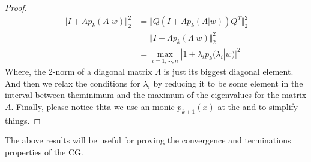 \documentclass[]{article}
\theoremstyle{definition}
\begin{document}
\begin{proof}
            \begin{align}
                \Vert I + Ap_k(A|w)\Vert_2^2
                &= \Vert Q(I + \Lambda p_k(\Lambda|w))Q^T\Vert_2^2
                \\
                &= \Vert I + \Lambda p_k(\Lambda|w)\Vert_2^2
                \\
                &= \max_{i=1,\cdots, n}|1 + \lambda_ip_k(\lambda_i|w)|^2
            \end{align}
            Where, the 2-norm of a diagonal matrix $\Lambda$ is just its biggest diagonal element. And then we relax the conditions for $\lambda_i$ by reducing it to be some element in the interval between theminimum and the maximum of the eigenvalues for the matrix $A$. Finally, please notice thta we use an monic $p_{k+1}(x)$ at the and to simplify things. 
        \end{proof}
        The above results will be useful for proving the convergence and terminations properties of the CG. 
\end{document}
